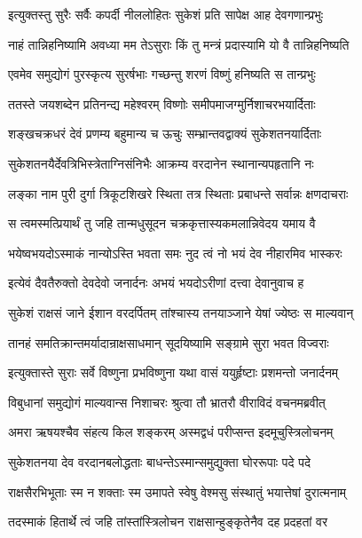 \twolineshloka
{इत्युक्तस्तु सुरैः सर्वैः कपर्दी नीललोहितः}
{सुकेशं प्रति सापेक्ष आह देवगणान्प्रभुः} %

\twolineshloka
{नाहं तान्निहनिष्यामि अवध्या मम तेऽसुराः}
{किं तु मन्त्रं प्रदास्यामि यो वै तान्निहनिष्यति} %

\twolineshloka
{एवमेव समुद्योगं पुरस्कृत्य सुरर्षभाः}
{गच्छन्तु शरणं विष्णुं हनिष्यति स तान्प्रभुः} %

\twolineshloka
{ततस्ते जयशब्देन प्रतिनन्द्य महेश्वरम्}
{विष्णोः समीपमाजग्मुर्निशाचरभयार्दिताः} %

\twolineshloka
{शङ्खचक्रधरं देवं प्रणम्य बहुमान्य च}
{ऊचुः सम्भ्रान्तवद्वाक्यं सुकेशतनयार्दिताः} %

\twolineshloka
{सुकेशतनयैर्देवत्रिभिस्त्रेताग्निसंनिभैः}
{आक्रम्य वरदानेन स्थानान्यपहृतानि नः} %

\twolineshloka
{लङ्का नाम पुरी दुर्गा त्रिकूटशिखरे स्थिता}
{तत्र स्थिताः प्रबाधन्ते सर्वान्नः क्षणदाचराः} %

\twolineshloka
{स त्वमस्मत्प्रियार्थं तु जहि तान्मधुसूदन}
{चक्रकृत्तास्यकमलान्निवेदय यमाय वै} %

\twolineshloka
{भयेष्वभयदोऽस्माकं नान्योऽस्ति भवता समः}
{नुद त्वं नो भयं देव नीहारमिव भास्करः} %

\twolineshloka
{इत्येवं दैवतैरुक्तो देवदेवो जनार्दनः}
{अभयं भयदोऽरीणां दत्त्वा देवानुवाच ह} %

\twolineshloka
{सुकेशं राक्षसं जाने ईशान वरदर्पितम्}
{तांश्चास्य तनयाञ्जाने येषां ज्येष्ठः स माल्यवान्} %

\twolineshloka
{तानहं समतिक्रान्तमर्यादान्राक्षसाधमान्}
{सूदयिष्यामि सङ्ग्रामे सुरा भवत विज्वराः} %

\twolineshloka
{इत्युक्तास्ते सुराः सर्वे विष्णुना प्रभविष्णुना}
{यथा वासं ययुर्हृष्टाः प्रशमन्तो जनार्दनम्} %

\twolineshloka
{विबुधानां समुद्योगं माल्यवान्स निशाचरः}
{श्रुत्वा तौ भ्रातरौ वीराविदं वचनमब्रवीत्} %

\twolineshloka
{अमरा ऋषयश्चैव संहत्य किल शङ्करम्}
{अस्मद्वधं परीप्सन्त इदमूचुस्त्रिलोचनम्} %

\twolineshloka
{सुकेशतनया देव वरदानबलोद्धताः}
{बाधन्तेऽस्मान्समुद्युक्ता घोररूपाः पदे पदे} %

\twolineshloka
{राक्षसैरभिभूताः स्म न शक्ताः स्म उमापते}
{स्वेषु वेश्मसु संस्थातुं भयात्तेषां दुरात्मनाम्} %

\twolineshloka
{तदस्माकं हितार्थे त्वं जहि तांस्तांस्त्रिलोचन}
{राक्षसान्हुङ्कृतेनैव दह प्रदहतां वर} %

